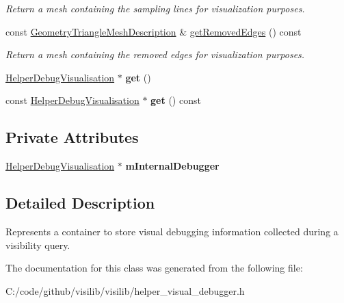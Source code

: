 \begin{DoxyCompactItemize}
\begin{DoxyCompactList}\small\item\em Return a mesh containing the sampling lines for visualization purposes. \end{DoxyCompactList}\item 
\mbox{\label{classvisilib_1_1_helper_visual_debugger_a40f4cad545c59df00d0ad3c7e4ad5565}} 
const \mbox{\hyperlink{structvisilib_1_1_geometry_triangle_mesh_description}{Geometry\+Triangle\+Mesh\+Description}} \& \mbox{\hyperlink{classvisilib_1_1_helper_visual_debugger_a40f4cad545c59df00d0ad3c7e4ad5565}{get\+Removed\+Edges}} () const
\begin{DoxyCompactList}\small\item\em Return a mesh containing the removed edges for visualization purposes. \end{DoxyCompactList}\item 
\mbox{\label{classvisilib_1_1_helper_visual_debugger_afd8630bb83bd0b6ae4664e6d06de1391}} 
\mbox{\hyperlink{classvisilib_1_1_helper_debug_visualisation}{Helper\+Debug\+Visualisation}} $\ast$ {\bfseries get} ()
\item 
\mbox{\label{classvisilib_1_1_helper_visual_debugger_a31e01e642fb2898714d45d3abbb426d6}} 
const \mbox{\hyperlink{classvisilib_1_1_helper_debug_visualisation}{Helper\+Debug\+Visualisation}} $\ast$ {\bfseries get} () const
\end{DoxyCompactItemize}
\subsection*{Private Attributes}
\begin{DoxyCompactItemize}
\item 
\mbox{\label{classvisilib_1_1_helper_visual_debugger_ab8984f9d49af7c99033b6197c99a36b9}} 
\mbox{\hyperlink{classvisilib_1_1_helper_debug_visualisation}{Helper\+Debug\+Visualisation}} $\ast$ {\bfseries m\+Internal\+Debugger}
\end{DoxyCompactItemize}


\subsection{Detailed Description}
Represents a container to store visual debugging information collected during a visibility query. 

The documentation for this class was generated from the following file\+:\begin{DoxyCompactItemize}
\item 
C\+:/code/github/visilib/visilib/helper\+\_\+visual\+\_\+debugger.\+h\end{DoxyCompactItemize}
